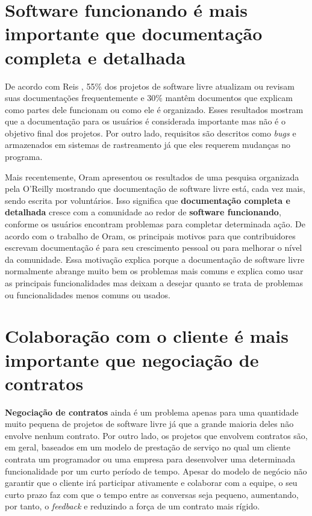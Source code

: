 \section{Software funcionando é mais importante que documentação
  completa e detalhada}
\label{sec:second-princ}

De acordo com Reis \cite{Reis2003}, 55\% dos projetos de software
livre atualizam ou revisam suas documentações frequentemente e 30\%
mantêm documentos que explicam como partes dele funcionam ou como ele
é organizado. Esses resultados mostram que a documentação para os
usuários é considerada importante mas não é o objetivo final dos
projetos. Por outro lado, requisitos são descritos como \emph{bugs} e
armazenados em sistemas de rastreamento já que eles requerem mudanças
no programa.

Mais recentemente, Oram \cite{Oram2007} apresentou os resultados de
uma pesquisa organizada pela O'Reilly mostrando que documentação de
software livre está, cada vez mais, sendo escrita por
voluntários. Isso significa que \textbf{documentação completa e
  detalhada} cresce com a comunidade ao redor de \textbf{software
  funcionando}, conforme os usuários encontram problemas para
completar determinada ação. De acordo com o trabalho de Oram, os
principais motivos para que contribuidores escrevam documentação é
para seu crescimento pessoal ou para melhorar o nível da
comunidade. Essa motivação explica porque a documentação de software
livre normalmente abrange muito bem os problemas mais comuns e explica
como usar as principais funcionalidades mas deixam a desejar quanto se
trata de problemas ou funcionalidades menos comuns ou usados.

\section{Colaboração com o cliente é mais importante que negociação de
  contratos}
\label{sec:third-princ}

\textbf{Negociação de contratos} ainda é um problema apenas para uma
quantidade muito pequena de projetos de software livre já que a grande
maioria deles não envolve nenhum contrato. Por outro lado, os projetos
que envolvem contratos são, em geral, baseados em um modelo de
prestação de serviço no qual um cliente contrata um programador ou uma
empresa para desenvolver uma determinada funcionalidade por um curto
período de tempo. Apesar do modelo de negócio não garantir que o
cliente irá participar ativamente e colaborar com a equipe, o seu
curto prazo faz com que o tempo entre as conversas seja pequeno,
aumentando, por tanto, o \emph{feedback} e reduzindo a força de um
contrato mais rígido.

